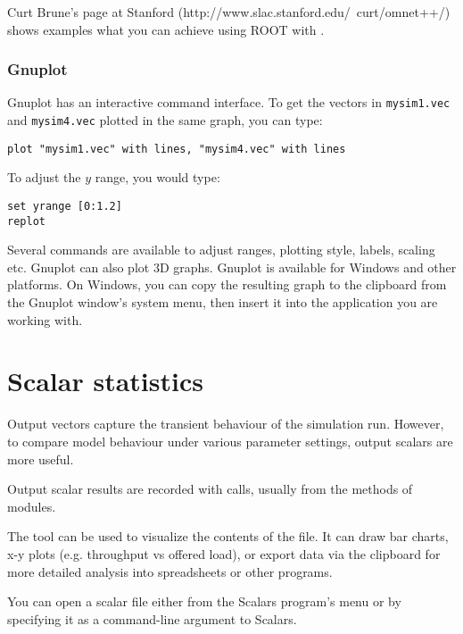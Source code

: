 Curt Brune's page at Stanford (http://www.slac.stanford.edu/~curt/omnet++/)
shows examples what you can achieve using ROOT with {\opp}.


\subsubsection{Gnuplot}

Gnuplot has an interactive command interface. To get the vectors in
\texttt{mysim1.vec} and \texttt{mysim4.vec} plotted in the same graph,
you can type:

\begin{verbatim}
plot "mysim1.vec" with lines, "mysim4.vec" with lines
\end{verbatim}

To adjust the $y$ range, you would type:

\begin{verbatim}
set yrange [0:1.2]
replot
\end{verbatim}

Several commands are available to adjust ranges, plotting style, labels,
scaling etc. Gnuplot can also plot 3D graphs. Gnuplot
is available for Windows and other platforms.
On Windows, you can copy the resulting graph to the clipboard from
the Gnuplot window's system menu, then insert it into the application you
are working with.


\section{Scalar statistics}
\label{sec:ch-ana-sim:output-scalars}


Output vectors capture the transient behaviour of the simulation run.
However, to compare model behaviour under various parameter settings,
output scalars are more useful.

Output scalar results are recorded with  calls,
usually from the  methods of modules.

The  tool can be used to visualize the contents of the
 file. It can draw bar charts, x-y plots
(e.g. throughput vs offered load), or export data via the clipboard
for more detailed analysis into spreadsheets or other programs.

You can open a scalar file either from the Scalars program's menu
or by specifying it as a command-line argument to Scalars.

